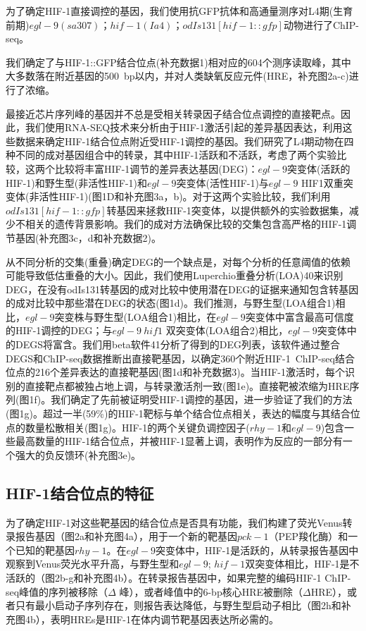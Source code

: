 \documentclass{ctexart}
\begin{document}
        为了确定HIF-1直接调控的基因，我们使用抗GFP抗体和高通量测序对L4期(生育前期)$egl-9(sa307)$；$hif-1(Ia4)$；$odIs131[hif-1::gfp]$动物进行了ChIP-seq。
        
        我们确定了与HIF-1::GFP结合位点(补充数据1)相对应的604个测序读取峰，其中大多数落在附近基因的500~bp以内，并对人类缺氧反应元件(HRE，补充图2a-c)进行了浓缩。
        
        最接近芯片序列峰的基因并不总是受相关转录因子结合位点调控的直接靶点。因此，我们使用RNA-SEQ技术来分析由于HIF-1激活引起的差异基因表达，利用这些数据来确定HIF-1结合位点附近受HIF-1调控的基因。我们研究了L4期动物在四种不同的成对基因组合中的转录，其中HIF-1活跃和不活跃，考虑了两个实验比较，这两个比较将丰富HIF-1调节的差异表达基因(DEG)：$egl-9$突变体(活跃的HIF-1)和野生型(非活性HIF-1)和$egl-9$突变体(活性HIF-1)与$egl-9$ HIF1双重突变体(非活性HIF-1)(图1D和补充图3a，b)。对于这两个实验比较，我们利用$odIs131[hif-1::gfp]$转基因来拯救HIF-1突变体，以提供额外的实验数据集，减少不相关的遗传背景影响。我们的成对方法确保比较的交集包含高严格的HIF-1调节基因(补充图3c，d和补充数据2)。
        
        从不同分析的交集(重叠)确定DEG的一个缺点是，对每个分析的任意阈值的依赖可能导致低估重叠的大小。因此，我们使用Luperchio重叠分析(LOA)40来识别DEG，在没有odIs131转基因的成对比较中使用潜在DEG的证据来通知包含转基因的成对比较中那些潜在DEG的状态(图1d)。我们推测，与野生型(LOA组合1)相比，$egl-9$突变株与野生型(LOA组合1)相比，在$egl-9$突变体中富含最高可信度的HIF-1调控的DEG；与$egl-9~hif1$ 双突变体(LOA组合2)相比，$egl-9$突变体中的DEGS将富含。我们用beta软件41分析了得到的DEG列表，该软件通过整合DEGS和ChIP-seq数据推断出直接靶基因，以确定360个附近HIF-1~ChIP-seq结合位点的216个差异表达的直接靶基因(图1d和补充数据3)。当HIF-1激活时，每个识别的直接靶点都被独占地上调，与转录激活剂一致(图1e)。直接靶被浓缩为HRE序列(图1f)。我们确定了先前被证明受HIF-1调控的基因，进一步验证了我们的方法(图1g)。超过一半(59\%)的HIF-1靶标与单个结合位点相关，表达的幅度与其结合位点的数量松散相关(图1g)。HIF-1的两个关键负调控因子($rhy-1$和$egl-9$)包含一些最高数量的HIF-1结合位点，并被HIF-1显著上调，表明作为反应的一部分有一个强大的负反馈环(补充图3e)。

    \subsection{HIF-1结合位点的特征}

        为了确定HIF-1对这些靶基因的结合位点是否具有功能，我们构建了荧光Venus转录报告基因（图2a和补充图4a），用于一个新的靶基因$pck-1$（PEP羧化酶）和一个已知的靶基因$rhy-1$。在$egl-9$突变体中，HIF-1是活跃的，从转录报告基因中观察到Venus荧光水平升高，与野生型和$egl-9$; $hif-1$双突变体相比，HIF-1是不活跃的（图2b-g和补充图4b）。在转录报告基因中，如果完整的编码HIF-1 ChIP-seq峰值的序列被移除（$\Delta$ 峰），或者峰值中的6-bp核心HRE被删除（$\Delta$HRE），或者只有最小启动子序列存在，则报告表达降低，与野生型启动子相比（图2h和补充图4b），表明HREs是HIF-1在体内调节靶基因表达所必需的。
\end{document}
